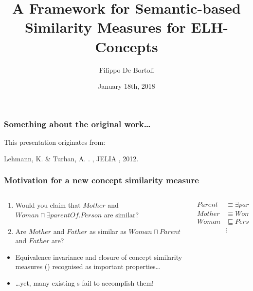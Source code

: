 \documentclass{beamer}
\title{A Framework for Semantic-based Similarity Measures for ELH-Concepts}
\author{Filippo De Bortoli}
\institute{European Master's Programme in Computational Logic, TU Dresden}
\date{January 18th, 2018}
\begin{document}
\maketitle

\begin{frame}
  \frametitle{Something about the original work\ldots}
  This presentation originates from:
  \begin{thebibliography}
    \bibitem{}
     Lehmann, K. \& Turhan, A.
	   .
	   , {JELIA} , 2012.
  \end{thebibliography}
\end{frame}

\begin{frame}
  \frametitle{Motivation for a new concept similarity measure}
  
  \begin{columns}
    \begin{column}{0.61\textwidth}
      \begin{enumerate}[<+->]
        \item Would you claim that \(Mother\) and
        \(Woman \sqcap \exists{}parentOf.Person\) are similar?
        \item Are \(Mother\) and \(Father\) as similar
        as \(Woman \sqcap Parent\) and \(Father\) are?
      \end{enumerate}
      \begin{itemize}[<+->]
        \item Equivalence \alert{invariance} and \alert{closure}
        of concept similarity measures (\csm)
        recognised as important properties\ldots
        \item \ldots yet, many existing
        \csm{}s fail to accomplish them!
      \end{itemize}
    \end{column}
    \begin{column}{0.39\textwidth}
      \begin{align*}
        Parent &\equiv \exists{}parentOf.Person \\
        Mother &\equiv Woman \sqcap Parent \\
        Woman &\sqsubseteq Person \\
        &\vdots         
      \end{align*}
    \end{column}
  \end{columns}
\end{frame}
\end{document}
